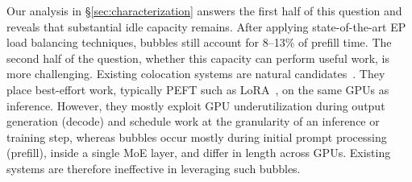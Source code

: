 Our analysis in \S\ref{sec:characterization} answers the first half of this question and reveals that substantial idle capacity remains.
After applying state-of-the-art \ac{EP} load balancing techniques, bubbles still account for 8--13\% of prefill time.
The second half of the question, whether this capacity can perform useful work, is more challenging.
Existing colocation systems are natural candidates~\cite{flexllm,llmstation,harli,deltaserve}.
They place best-effort work, typically \ac{PEFT} such as \ac{LoRA}~\cite{lora}, on the same GPUs as inference.
However, they mostly exploit GPU underutilization during output generation (decode) and schedule work at the granularity of an inference or training step, whereas bubbles occur mostly during initial prompt processing (prefill), inside a single \ac{MoE} layer, and differ in length across GPUs.
Existing systems are therefore ineffective in leveraging such bubbles.



